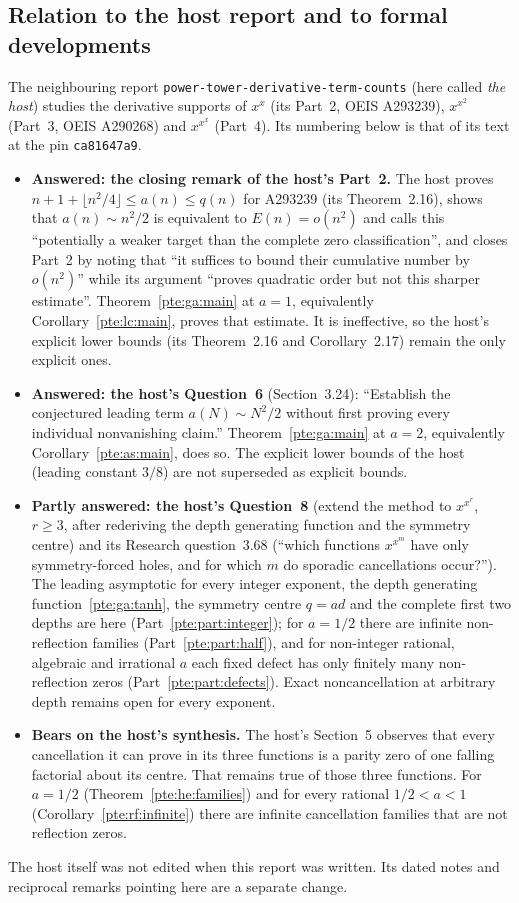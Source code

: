 \documentclass[11pt,a4paper]{article}
\numberwithin{equation}{section}
\theoremstyle{definition}
\theoremstyle{plain}
\begin{document}
\subsection{Relation to the host report and to formal developments}\label{pte:sec:host}
The neighbouring report \texttt{power-\allowbreak{}tower-\allowbreak{}derivative-\allowbreak{}term-\allowbreak{}counts} (here called \emph{the host}) studies the derivative supports of $x^x$ (its Part~2, OEIS A293239), $x^{x^2}$ (Part~3, OEIS A290268) and $x^{x^x}$ (Part~4). Its numbering below is that of its text at the pin \texttt{ca81647a9}.
\begin{itemize}
\item \textbf{Answered: the closing remark of the host's Part~2.} The host proves $n+1+\lfloor n^2/4\rfloor\le a(n)\le q(n)$ for A293239 (its Theorem~2.16), shows that $a(n)\sim n^2/2$ is equivalent to $E(n)=o(n^2)$ and calls this ``potentially a weaker target than the complete zero classification'', and closes Part~2 by noting that ``it suffices to bound their cumulative number by $o(n^2)$'' while its argument ``proves quadratic order but not this sharper estimate''. Theorem~\ref{pte:ga:main} at $a=1$, equivalently Corollary~\ref{pte:lc:main}, proves that estimate. It is ineffective, so the host's explicit lower bounds (its Theorem~2.16 and Corollary~2.17) remain the only explicit ones.
\item \textbf{Answered: the host's Question~6} (Section~3.24): ``Establish the conjectured leading term $a(N)\sim N^2/2$ without first proving every individual nonvanishing claim.'' Theorem~\ref{pte:ga:main} at $a=2$, equivalently Corollary~\ref{pte:as:main}, does so. The explicit lower bounds of the host (leading constant $3/8$) are not superseded as explicit bounds.
\item \textbf{Partly answered: the host's Question~8} (extend the method to $x^{x^r}$, $r\ge3$, after rederiving the depth generating function and the symmetry centre) and its Research question~3.68 (``which functions $x^{x^m}$ have only symmetry-forced holes, and for which $m$ do sporadic cancellations occur?''). The leading asymptotic for every integer exponent, the depth generating function~\eqref{pte:ga:tanh}, the symmetry centre $q=ad$ and the complete first two depths are here (Part~\ref{pte:part:integer}); for $a=1/2$ there are infinite non-reflection families (Part~\ref{pte:part:half}), and for non-integer rational, algebraic and irrational $a$ each fixed defect has only finitely many non-reflection zeros (Part~\ref{pte:part:defects}). Exact noncancellation at arbitrary depth remains open for every exponent.
\item \textbf{Bears on the host's synthesis.} The host's Section~5 observes that every cancellation it can prove in its three functions is a parity zero of one falling factorial about its centre. That remains true of those three functions. For $a=1/2$ (Theorem~\ref{pte:he:families}) and for every rational $1/2<a<1$ (Corollary~\ref{pte:rf:infinite}) there are infinite cancellation families that are not reflection zeros.
\end{itemize}
The host itself was not edited when this report was written. Its dated notes and reciprocal remarks pointing here are a separate change.
\end{document}
